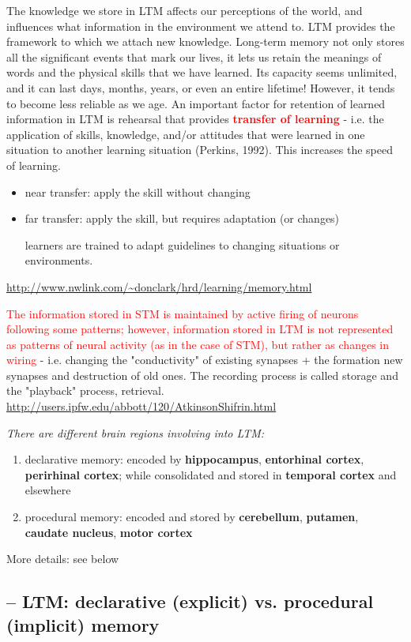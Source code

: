 The knowledge we store in LTM affects our perceptions of the world, and
influences what information in the environment we attend to. LTM provides the
framework to which we attach new knowledge.
Long-term memory not only stores all the significant events that mark our lives,
it lets us retain the meanings of words and the physical skills that we have
learned. Its capacity seems unlimited, and it can last days, months, years, or
even an entire lifetime! However, it tends to become less reliable as we age.
An important factor for retention of learned information in LTM is rehearsal
that provides \textcolor{red}{\bf transfer of learning} - i.e. the application
of skills, knowledge, and/or attitudes that were learned in one situation to another
learning situation (Perkins, 1992). This increases the speed of learning.
\begin{itemize}
  \item near transfer: apply the skill without changing	
  \item far transfer: apply the skill, but requires adaptation (or changes)
  
  learners are trained to adapt guidelines to changing situations or
  environments.
\end{itemize}
\url{http://www.nwlink.com/~donclark/hrd/learning/memory.html}

\textcolor{red}{The information stored in STM is maintained by active firing of
neurons following some patterns; however, information stored in LTM is not
represented as patterns of neural activity (as in the case of STM), but rather
as changes in wiring} - i.e. changing the "conductivity" of existing synapses +
the formation new synapses and destruction of old ones. The recording process is
called storage and the "playback" process, retrieval.
\url{http://users.ipfw.edu/abbott/120/AtkinsonShifrin.html}

{\it There are different brain regions involving into LTM:}
\begin{enumerate}
  \item declarative memory: encoded by {\bf hippocampus}, {\bf entorhinal
  cortex}, {\bf perirhinal cortex}; while consolidated and stored in {\bf
  temporal cortex} and elsewhere
  \item procedural memory: encoded and stored by {\bf cerebellum}, {\bf
  putamen}, {\bf caudate nucleus}, {\bf motor cortex}
\end{enumerate}
More details: see below

\subsection{-- LTM: declarative (explicit)  vs.
procedural (implicit) memory}

